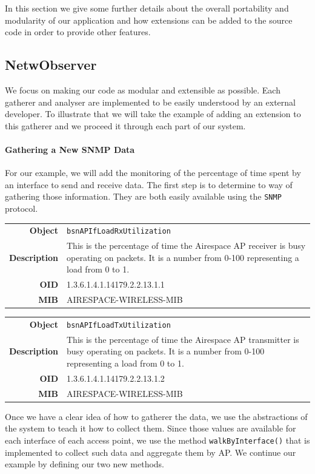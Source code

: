 In this section we give some further details about the overall portability and modularity of our application and how extensions can be added to the source code in order to provide other features.

\subsection{NetwObserver}
We focus on making our code as modular and extensible as possible. Each gatherer and analyser are implemented to be easily understood by an external developer. To illustrate that we will take the example of adding an extension to this gatherer and we proceed it through each part of our system.

\paragraph*{Gathering a New SNMP Data} For our example, we will add the monitoring of the percentage of time spent by an interface to send and receive data. The first step is to determine to way of gathering those information. They are both easily available using the \texttt{SNMP} protocol.

\begin{tabular}{|r l|}
\hline
\textbf{Object} & \texttt{bsnAPIfLoadRxUtilization} \\
\textbf{Description} & \parbox{11cm}{This is the percentage of time the Airespace AP receiver is busy operating on packets. It is a number from 0-100 representing a load from 0 to 1.} \\
\textbf{OID} & 1.3.6.1.4.1.14179.2.2.13.1.1 \\
\textbf{MIB} & AIRESPACE-WIRELESS-MIB \\
\hline
\end{tabular}

\begin{tabular}{|r l|}
\hline
\textbf{Object} & \texttt{bsnAPIfLoadTxUtilization} \\
\textbf{Description} & \parbox{11cm}{This is the percentage of time the Airespace AP transmitter is busy operating on packets. It is a number from 0-100 representing a load from 0 to 1.} \\
\textbf{OID} & 1.3.6.1.4.1.14179.2.2.13.1.2 \\
\textbf{MIB} & AIRESPACE-WIRELESS-MIB \\
\hline
\end{tabular}

Once we have a clear idea of how to gatherer the data, we use the abstractions of the system to teach it how to collect them. Since those values are available for each interface of each access point, we use the method \texttt{walkByInterface()} that is implemented to collect such data and aggregate them by AP. We continue our example by defining our two new methods.\\

